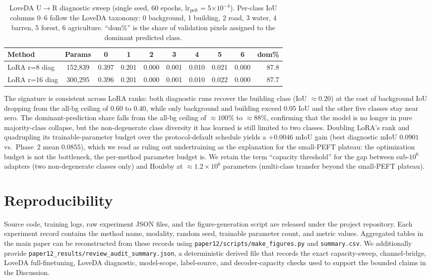 \begin{table}[h]
\centering
\small
\caption{LoveDA U$\rightarrow$R diagnostic sweep (single seed, 60 epochs, lr$_{\mathrm{peft}}$$=$5$\times 10^{-4}$). Per-class IoU columns 0--6 follow the LoveDA taxonomy: 0 background, 1 building, 2 road, 3 water, 4 barren, 5 forest, 6 agriculture. ``dom\%'' is the share of validation pixels assigned to the dominant predicted class.}
\label{tab:loveda-diag}
\begin{tabular}{lccccccccr}
\toprule
Method & Params & 0 & 1 & 2 & 3 & 4 & 5 & 6 & dom\% \\
\midrule
LoRA r=8  diag & 152{,}839 & 0.397 & 0.201 & 0.000 & 0.001 & 0.010 & 0.021 & 0.000 & 87.8 \\
LoRA r=16 diag & 300{,}295 & 0.396 & 0.201 & 0.000 & 0.001 & 0.010 & 0.022 & 0.000 & 87.7 \\
\bottomrule
\end{tabular}
\end{table}

The signature is consistent across LoRA ranks: both diagnostic runs recover the building class (IoU $\approx 0.20$) at the cost of background IoU dropping from the all-bg ceiling of $0.60$ to $0.40$, while only background and building exceed 0.05 IoU and the other five classes stay near zero. The dominant-prediction share falls from the all-bg ceiling of $\approx$$100\%$ to $\approx$$88\%$, confirming that the model is no longer in pure majority-class collapse, but the non-degenerate class diversity it has learned is still limited to two classes. Doubling LoRA's rank and quadrupling its trainable-parameter budget over the protocol-default schedule yields a +$0.0046$ mIoU gain (best diagnostic mIoU $0.0901$ vs.\ Phase~2 mean $0.0855$), which we read as ruling out undertraining as the explanation for the small-PEFT plateau: the optimization budget is not the bottleneck, the per-method parameter budget is. We retain the term ``capacity threshold'' for the gap between sub-$10^6$ adapters (two non-degenerate classes only) and Houlsby at $\approx$$1.2 \times 10^6$ parameters (multi-class transfer beyond the small-PEFT plateau).

\section{Reproducibility}
\label{app:repro}

Source code, training logs, raw experiment JSON files, and the figure-generation script are released under the project repository. Each experiment record contains the method name, modality, random seed, trainable parameter count, and metric values. Aggregated tables in the main paper can be reconstructed from these records using \texttt{paper12/scripts/make\_figures.py} and \texttt{summary.csv}. We additionally provide \texttt{paper12\_results/review\_audit\_summary.json}, a deterministic derived file that records the exact capacity-sweep, channel-bridge, LoveDA full-finetuning, LoveDA diagnostic, model-scope, label-source, and decoder-capacity checks used to support the bounded claims in the Discussion.

